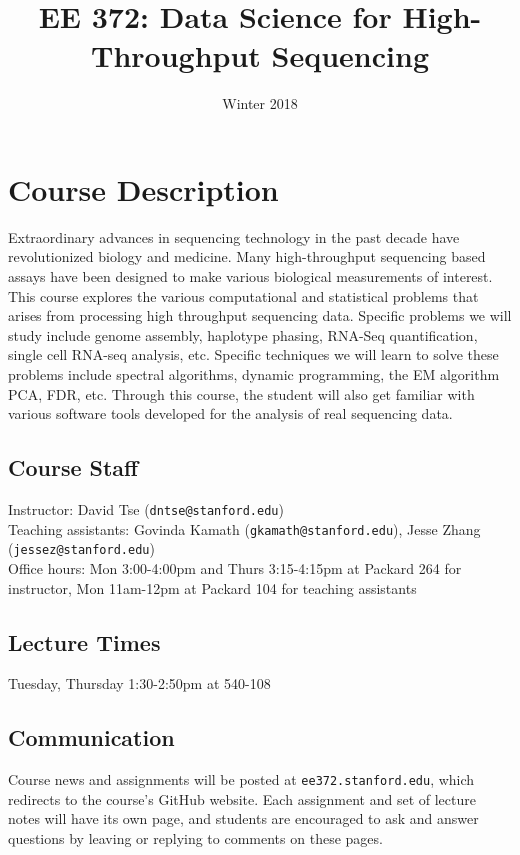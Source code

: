 \documentclass[11pt,onecolumn]{article}
\title{EE 372: Data Science for High-Throughput Sequencing}
\author{Winter 2018}
\date{\vspace{-5ex}}
\begin{document}
\maketitle

\section*{Course Description}
Extraordinary advances in sequencing technology in the past decade have revolutionized biology and medicine. Many high-throughput sequencing based assays have been designed to make various biological measurements of interest. This course explores the various computational and statistical problems that arises from processing high throughput sequencing data. Specific problems we will study include genome assembly, haplotype phasing, RNA-Seq quantification, single cell RNA-seq analysis, etc.  Specific techniques we will learn to solve these problems include spectral algorithms, dynamic programming, the EM algorithm PCA, FDR, etc. Through this course, the student will also get familiar with various software tools developed for the analysis of real sequencing data.

\subsection*{Course Staff}
Instructor: David Tse (\texttt{dntse@stanford.edu}) \\
Teaching assistants: Govinda Kamath (\texttt{gkamath@stanford.edu}), Jesse Zhang (\texttt{jessez@stanford.edu}) \\
Office hours: Mon 3:00-4:00pm and Thurs 3:15-4:15pm at Packard 264 for instructor, Mon 11am-12pm at Packard 104 for teaching assistants

\subsection*{Lecture Times}
Tuesday, Thursday 1:30-2:50pm at 540-108

\subsection*{Communication}
Course news and assignments will be posted at \texttt{ee372.stanford.edu}, which redirects to the course's GitHub website. Each assignment and set of lecture notes will have its own page, and students are encouraged to ask and answer questions by leaving or replying to comments on these pages.
\end{document}

